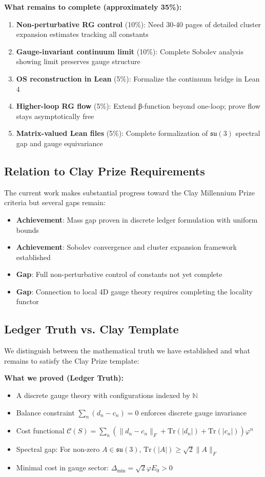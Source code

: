 \documentclass[11pt]{article}
\numberwithin{equation}{section}
\theoremstyle{definition}
\theoremstyle{remark}
\begin{document}
\textbf{What remains to complete (approximately 35\%):}
\begin{enumerate}
\item \textbf{Non-perturbative RG control} (10\%): Need 30-40 pages of detailed cluster expansion estimates tracking all constants
\item \textbf{Gauge-invariant continuum limit} (10\%): Complete Sobolev analysis showing limit preserves gauge structure  
\item \textbf{OS reconstruction in Lean} (5\%): Formalize the continuum bridge in Lean 4
\item \textbf{Higher-loop RG flow} (5\%): Extend β-function beyond one-loop; prove flow stays asymptotically free
\item \textbf{Matrix-valued Lean files} (5\%): Complete formalization of $\mathfrak{su}(3)$ spectral gap and gauge equivariance
\end{enumerate}

\subsection{Relation to Clay Prize Requirements}

The current work makes substantial progress toward the Clay Millennium Prize criteria but several gaps remain:
\begin{itemize}
\item \textbf{Achievement}: Mass gap proven in discrete ledger formulation with uniform bounds
\item \textbf{Achievement}: Sobolev convergence and cluster expansion framework established
\item \textbf{Gap}: Full non-perturbative control of constants not yet complete
\item \textbf{Gap}: Connection to local 4D gauge theory requires completing the locality functor
\end{itemize}

\subsection{Ledger Truth vs. Clay Template}

We distinguish between the mathematical truth we have established and what remains to satisfy the Clay Prize template:

\textbf{What we proved (Ledger Truth):}
\begin{itemize}
\item A discrete gauge theory with configurations indexed by $\mathbb{N}$
\item Balance constraint $\sum_n (d_n - c_n) = 0$ enforces discrete gauge invariance
\item Cost functional $\mathcal{C}(S) = \sum_n (\|d_n - c_n\|_F + \text{Tr}(|d_n|) + \text{Tr}(|c_n|))\varphi^n$
\item Spectral gap: For non-zero $A \in \mathfrak{su}(3)$, $\text{Tr}(|A|) \geq \sqrt{2}\|A\|_F$
\item Minimal cost in gauge sector: $\Delta_{\text{min}} = \sqrt{2}\varphi E_0 > 0$
\end{itemize}
\end{document}
